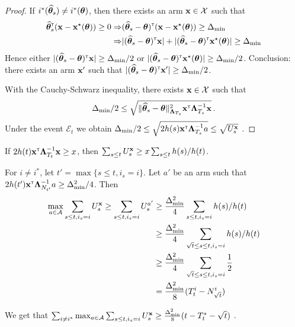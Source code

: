 \begin{proof}
If $i^*(\widehat{{\boldsymbol \theta}}_s) \neq i^*({\boldsymbol \theta})$, then there exists an arm ${\bf x}\in\mathcal{X}$ such that
\begin{align*}
\widehat{{\boldsymbol \theta}}_s^\mathsf{\scriptscriptstyle T}({\bf x} - {\bf x}^\star({\boldsymbol \theta})) \ge 0
\Rightarrow & (\widehat{{\boldsymbol \theta}}_s - {\boldsymbol \theta})^\mathsf{\scriptscriptstyle T} ({\bf x} - {\bf x}^\star({\boldsymbol \theta})) \ge \Delta_{\min}
\\
\Rightarrow & | (\widehat{{\boldsymbol \theta}}_s - {\boldsymbol \theta})^\mathsf{\scriptscriptstyle T} {\bf x} | + | (\widehat{{\boldsymbol \theta}}_s - {\boldsymbol \theta})^\mathsf{\scriptscriptstyle T} {\bf x}^\star({\boldsymbol \theta}) | \ge \Delta_{\min}
\end{align*}
Hence either $| (\widehat{{\boldsymbol \theta}}_s - {\boldsymbol \theta})^\mathsf{\scriptscriptstyle T} {\bf x} | \ge \Delta_{\min}/2$ or $| (\widehat{{\boldsymbol \theta}}_s - {\boldsymbol \theta})^\mathsf{\scriptscriptstyle T} {\bf x}^\star({\boldsymbol \theta}) | \ge \Delta_{\min}/2$. Conclusion: there exists an arm ${\bf x}'$ such that $| (\widehat{{\boldsymbol \theta}}_s - {\boldsymbol \theta})^\mathsf{\scriptscriptstyle T} {\bf x}' | \ge \Delta_{\min}/2$.

With the Cauchy-Schwarz inequality, there exists ${\bf x}\in\mathcal{X}$ such that
\[
    \Delta_{\min}/2 \le \sqrt{\Vert \widehat{{\boldsymbol \theta}}_s - {\boldsymbol \theta} \Vert^2_{{\boldsymbol \Lambda}_{T_s}} {\bf x}^\mathsf{\scriptscriptstyle T} {\boldsymbol \Lambda}_{T_s}^{-1}{\bf x}}\,.
\]
Under the event $\mathcal E_t$ we obtain $\Delta_{\min}/2 \le \sqrt{2 h(s) {\bf x}^\mathsf{\scriptscriptstyle T} {\boldsymbol \Lambda}_{T_s}^{-1}a} \le \sqrt{U_s^{\bf x}}$ .
\end{proof}

\begin{lemma}
If $2h(t){\bf x}^\mathsf{\scriptscriptstyle T}{\boldsymbol \Lambda}_{T_t}^{-1}{\bf x} \ge x$, then $\sum_{s\le t} U_s^{\bf x} \ge x \sum_{s\le t} h(s)/h(t)$.
\end{lemma}

For $i\neq i^*$, let $t'= \max\{s\le t, i_s = i\}$. Let $a'$ be an arm such that $2h(t'){\bf x}^\mathsf{\scriptscriptstyle T} {\boldsymbol \Lambda}_{N_{t'}}^{-1}a \ge \Delta_{\min}^2/4$. Then
\begin{align*}
\max_{a\in \mathcal{A}}\sum_{s\le t, i_s=i} U_s^{\bf x}
\ge \sum_{s\le t, i_s=i} U_s^{a'}
&\ge \frac{\Delta_{\min}^2}{4} \sum_{s\le t, i_s=i} h(s)/h(t)
\\
&\ge \frac{\Delta_{\min}^2}{4} \sum_{\sqrt{t} \le s\le t, i_s=i} h(s)/h(t)
\\
&\ge \frac{\Delta_{\min}^2}{4} \sum_{\sqrt{t} \le s\le t, i_s=i} \frac{1}{2}
\\
&= \frac{\Delta_{\min}^2}{8} (T_t^i - N_{\sqrt{t}}^i)
\end{align*}

We get that $\sum_{i\neq i^*}\max_{a\in \mathcal{A}}\sum_{s\le t, i_s=i} U_s^{\bf x} \ge \frac{\Delta_{\min}^2}{8} (t - T_t^* - \sqrt{t})$ .

